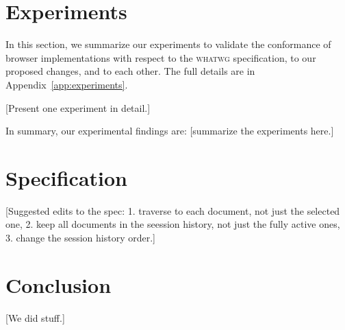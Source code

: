 \documentclass{notes}
\newtheorem{counterexample}{Counterexample}
\begin{document}

\section{Experiments}
\label{sec:experiments}

In this section, we summarize our experiments to validate the conformance of browser
implementations with respect to the \textsc{whatwg} specification, to our proposed
changes, and to each other. The full details are in Appendix~\ref{app:experiments}.

[Present one experiment in detail.]

In summary, our experimental findings are:
[summarize the experiments here.]

\section{Specification}

[Suggested edits to the spec:
  1. traverse to each document, not just the selected one,
  2. keep all documents in the seession history, not just the fully active ones,
  3. change the session history order.]

\section{Conclusion}

[We did stuff.]




\appendix

\end{document}
